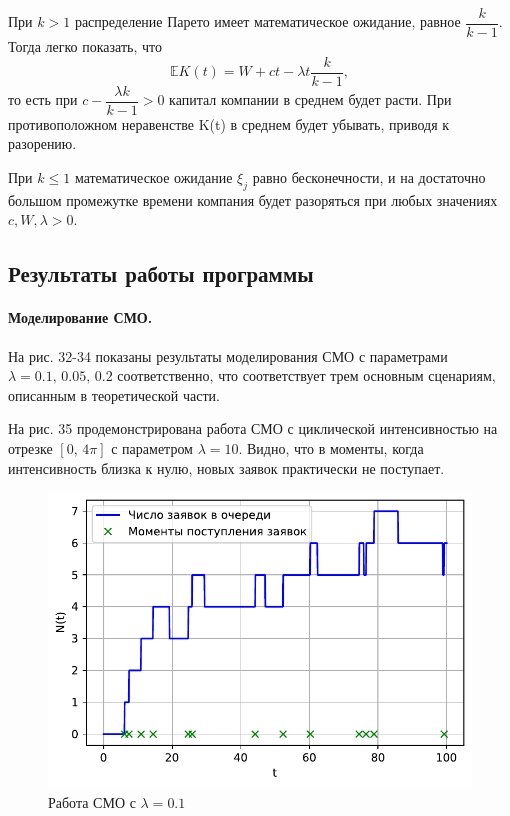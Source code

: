 \documentclass[16pt]{article}
\begin{document}
При $k > 1$ распределение Парето имеет математическое ожидание, равное $\dfrac{k}{k-1}$. Тогда легко показать, что 
$$\mathbb{E}K(t) = W + ct - \lambda t \dfrac{k}{k-1},$$
то есть при $c - \dfrac{\lambda k}{k-1} > 0$ капитал компании в среднем будет расти. При противоположном неравенстве K(t) в среднем будет убывать, приводя к разорению. 

При $k \leq 1$ математическое ожидание $\xi_j$ равно бесконечности, и на достаточно большом промежутке времени компания  будет разоряться при любых значениях $c, W, \lambda > 0$.
\subsection{Результаты работы программы}

\paragraph{Моделирование СМО.} На рис. 32-34 показаны результаты моделирования СМО с параметрами $\lambda = 0.1,\, 0.05,\, 0.2$ соответственно, что соответствует трем основным сценариям, описанным в теоретической части.

На рис. 35 продемонстрирована работа СМО с циклической интенсивностью на отрезке $[0,\, 4\pi]$ с параметром $\lambda = 10$. Видно, что в моменты, когда интенсивность близка к нулю, новых заявок практически не поступает.

\begin{figure}
	\center
	\includegraphics[scale=0.7]{11_1.pdf}
	\caption{Работа СМО с $\lambda = 0.1$}
\end{figure}
\end{document}
